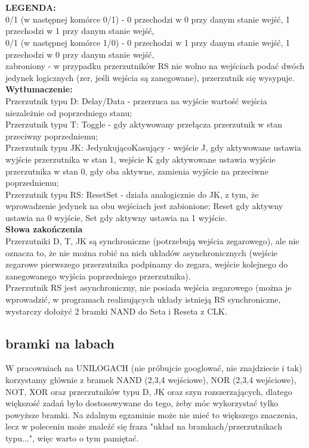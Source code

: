 \;\\
\;\\
\textbf{LEGENDA:}\\
0/1 (w następnej komórce 0/1) - 0 przechodzi w 0 przy danym stanie wejść, 1 przechodzi w 1 przy danym stanie wejść,\\
0/1 (w następnej komórce 1/0) - 0 przechodzi w 1 przy danym stanie wejść, 1 przechodzi w 0 przy danym stanie wejść,\\
zabroniony - w przypadku przerzutników RS nie wolno na wejściach podać dwóch jedynek logicznych (zer, jeśli wejścia są zanegowane), przerzutnik się wysypuje.\\
\textbf{Wytłumaczenie:}\\
Przerzutnik typu D: Delay/Data - przerzuca na wyjście wartość wejścia niezależnie od poprzedniego stanu;\\
Przerzutnik typu T: Toggle - gdy aktywowany przełącza przerzutnik w stan przeciwny poprzedniemu;\\
Przerzutnik typu JK: JedynkującoKasujący - wejście J, gdy aktywowane ustawia wyjście przerzutnika w stan 1, wejście K gdy aktywowane ustawia wyjście przerzutnika w stan 0, gdy oba aktywne, zamienia wyjście na przeciwne poprzedniemu;\\
Przerzutnik typu RS: ResetSet - działa analogicznie do JK, z tym, że wprowadzenie jedynek na obu wejściach jest zabionione; Reset gdy aktywny ustawia na 0 wyjście, Set gdy aktywny ustawia na 1 wyjście.\\
\textbf{Słowa zakończenia}\\
Przerzutniki D, T, JK są synchroniczne (potrzebują wejścia zegarowego), ale nie oznacza to, że nie można robić na nich układów asynchronicznych (wejście zegarowe pierwszego przerzutnika podpinamy do zegara, wejście kolejnego do zanegowanego wyjścia poprzedniego przerzutnika).\\
Przerzutnik RS jest asynchroniczny, nie posiada wejścia zegarowego (można je wprowadzić, w programach realizujących układy istnieją RS synchroniczne, wystarczy dołożyć 2 bramki NAND do Seta i Reseta z CLK.

\subsection{bramki na labach}

W pracowniach na UNILOGACH (nie próbujcie googlować, nie znajdziecie i tak) korzystamy głównie z bramek NAND (2,3,4 wejściowe), NOR (2,3,4 wejściowe), NOT, XOR oraz przerzutników typu D, JK oraz szyn rozszerzających, dlatego większość zadań było dostosowywane do tego, żeby móc wykorzystać tylko powyższe bramki. Na zdalnym egzaminie może nie mieć to większego znaczenia, lecz w poleceniu może znaleźć się fraza "układ na bramkach/przerzutnikach typu...", więc warto o tym pamiętać.

